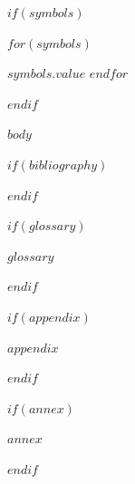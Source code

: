 \documentclass[
  12pt,
  oneside,
  a4paper,
  chapter=TITLE,
  english,
  $if(lang)$$lang$$else$portuguese$endif$
]{abntex2}
\begin{document}
$if(symbols)$
\begin{simbolos}
$for(symbols)$
  \item[$symbols.key$] $symbols.value$
$endfor$
\end{simbolos}
$endif$

\tableofcontents*
\cleardoublepage

\textual
\setcounter{secnumdepth}{3}

$body$

\postextual

$if(bibliography)$


$endif$

$if(glossary)$
\begin{glossario}
$glossary$
\end{glossario}
$endif$

$if(appendix)$
\begin{apendicesenv}
$appendix$
\end{apendicesenv}
$endif$

$if(annex)$
\begin{anexosenv}
$annex$
\end{anexosenv}
$endif$
\end{document}
